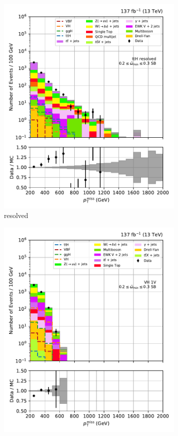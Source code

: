 \begin{figure}[htbp]
\begin{subfigure}[b]{0.24\textwidth}
        \includegraphics[width=\textwidth]{figures/region_plots/full_Run2/sideband_4/ttH_resolved.pdf}
        \caption{\ttH resolved}
    \end{subfigure}
    \begin{subfigure}[b]{0.24\textwidth}
        \includegraphics[width=\textwidth]{figures/region_plots/full_Run2/sideband_4/VH_1V.pdf}

\end{subfigure}
\end{figure}
